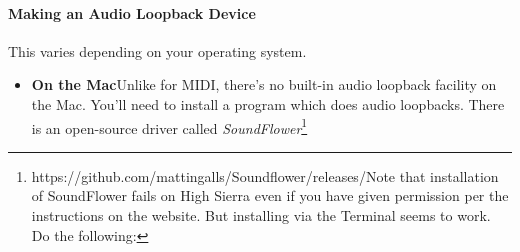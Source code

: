 \documentclass{article}
\begin{document}
\paragraph{Making an Audio Loopback Device}  This varies depending on your operating system.
\begin{itemize}
\item {\bf On the Mac}\quad Unlike for MIDI, there's no built-in audio loopback facility on the Mac.  You'll need to install a program which does audio loopbacks.  There is an open-source driver called {\it SoundFlower}\footnote{https:/\!/github.com/mattingalls/Soundflower/releases/\qquad Note that installation of SoundFlower fails on High Sierra even if you have given permission per the instructions on the website.  But installing via the Terminal seems to work.  Do the following:

}
\end{itemize}
\end{document}
